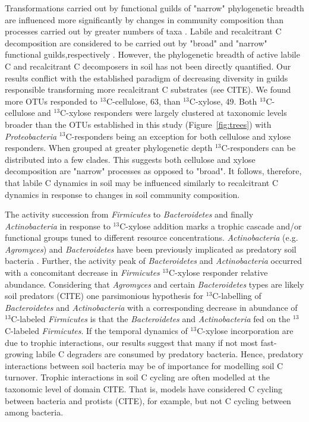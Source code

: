Transformations carried out by functional guilds of "narrow" phylogenetic
breadth are influenced more significantly by changes in community composition
than processes carried out by greater numbers of taxa
\citep{Schimel_1995,McGuire2010}. Labile and recalcitrant C decomposition are
considered to be carried out by "broad" and "narrow" functional
guilds,respectively \citep{Schimel_1995,McGuire2010}. However, the phylogenetic
breadth of active labile C and recalcitrant C decomposers in soil has not been
directly quantified. Our results conflict with the established
paradigm of decreasing diversity in guilds responsible transforming more
recalcitrant C substrates (see CITE). We found more OTUs responded to
$^{13}$C-cellulose, 63, than $^{13}$C-xylose, 49. Both $^{13}$C-cellulose and
$^{13}$C-xylose responders were largely clustered at taxonomic levels broader
than the OTUs established in this study (Figure~\ref{fig:trees}) with
\textit{Proteobacteria} $^{13}$C-responders being an exception for both
cellulose and xylose responders. When grouped at greater phylogenetic depth
$^{13}$C-responders can be distributed into a few clades. This suggests both
cellulose and xylose decomposition are "narrow" processes as opposed to
"broad". It follows, therefore, that labile C dynamics in soil may be
influenced similarly to recalcitrant C dynamics in response to changes in soil
community composition. 

The activity succession from \textit{Firmicutes} to \textit{Bacteroidetes} and
finally \textit{Actinobacteria} in response to $^{13}$C-xylose addition marks
a trophic cascade and/or functional groups tuned to different resource
concentrations. \textit{Actinobacteria} (e.g. \textit{Agromyces}) and
\textit{Bacteroidetes} have been previously implicated as predatory soil
bacteria \citep{Lueders2006}. Further, the activity peak of
\textit{Bacteroidetes} and \textit{Actinobacteria} occurred with a concomitant
decrease in \textit{Firmicutes} $^{13}$C-xylose responder relative abundance.
Considering that \textit{Agromyces} and certain \textit{Bacteroidetes} types
are likely soil predators (CITE) one parsimonious hypothesis for
$^{13}$C-labelling of \textit{Bacteroidetes} and \textit{Actinobacteria} with
a corresponding decrease in abundance of $^{13}$C-labeled \textit{Firmicutes}
is that the \textit{Bacteroidetes} and \textit{Actinobacteria} fed on the
$^{13}$C-labeled \textit{Firmicutes}. If the temporal dynamics of
$^{13}$C-xylose incorporation are due to trophic interactions, our results
suggest that many if not most fast-growing labile C degraders are consumed by
predatory bacteria. Hence, predatory interactions between soil bacteria may be
of importance for modelling soil C turnover. Trophic interactions in soil
C cycling are often modelled at the taxonomic level of domain CITE. That is,
models have considered C cycling between bacteria and protists (CITE), for
example, but not C cycling between among bacteria.

